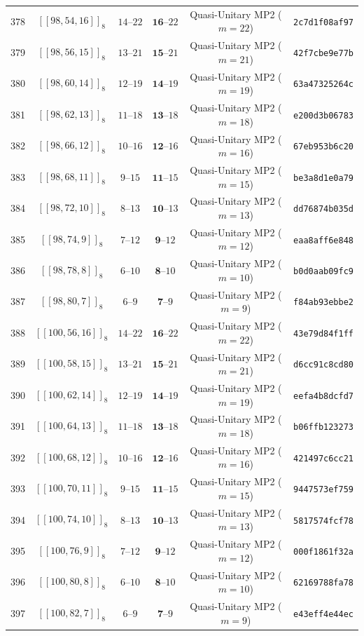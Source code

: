 \documentclass[11pt,a4paper]{article}
\theoremstyle{remark}
\begin{document}
{\begin{longtable}{@{}rccccl@{}}
378 & $[[98,54,16]]_{8}$ & $14\text{--}22$ & $\mathbf{16}\text{--}22$ & Quasi-Unitary MP2 ($m=22$) & \texttt{2c7d1f08af97} \\
379 & $[[98,56,15]]_{8}$ & $13\text{--}21$ & $\mathbf{15}\text{--}21$ & Quasi-Unitary MP2 ($m=21$) & \texttt{42f7cbe9e77b} \\
380 & $[[98,60,14]]_{8}$ & $12\text{--}19$ & $\mathbf{14}\text{--}19$ & Quasi-Unitary MP2 ($m=19$) & \texttt{63a47325264c} \\
381 & $[[98,62,13]]_{8}$ & $11\text{--}18$ & $\mathbf{13}\text{--}18$ & Quasi-Unitary MP2 ($m=18$) & \texttt{e200d3b06783} \\
382 & $[[98,66,12]]_{8}$ & $10\text{--}16$ & $\mathbf{12}\text{--}16$ & Quasi-Unitary MP2 ($m=16$) & \texttt{67eb953b6c20} \\
383 & $[[98,68,11]]_{8}$ & $9\text{--}15$ & $\mathbf{11}\text{--}15$ & Quasi-Unitary MP2 ($m=15$) & \texttt{be3a8d1e0a79} \\
384 & $[[98,72,10]]_{8}$ & $8\text{--}13$ & $\mathbf{10}\text{--}13$ & Quasi-Unitary MP2 ($m=13$) & \texttt{dd76874b035d} \\
385 & $[[98,74,9]]_{8}$ & $7\text{--}12$ & $\mathbf{9}\text{--}12$ & Quasi-Unitary MP2 ($m=12$) & \texttt{eaa8aff6e848} \\
386 & $[[98,78,8]]_{8}$ & $6\text{--}10$ & $\mathbf{8}\text{--}10$ & Quasi-Unitary MP2 ($m=10$) & \texttt{b0d0aab09fc9} \\
387 & $[[98,80,7]]_{8}$ & $6\text{--}9$ & $\mathbf{7}\text{--}9$ & Quasi-Unitary MP2 ($m=9$) & \texttt{f84ab93ebbe2} \\
388 & $[[100,56,16]]_{8}$ & $14\text{--}22$ & $\mathbf{16}\text{--}22$ & Quasi-Unitary MP2 ($m=22$) & \texttt{43e79d84f1ff} \\
389 & $[[100,58,15]]_{8}$ & $13\text{--}21$ & $\mathbf{15}\text{--}21$ & Quasi-Unitary MP2 ($m=21$) & \texttt{d6cc91c8cd80} \\
390 & $[[100,62,14]]_{8}$ & $12\text{--}19$ & $\mathbf{14}\text{--}19$ & Quasi-Unitary MP2 ($m=19$) & \texttt{eefa4b8dcfd7} \\
391 & $[[100,64,13]]_{8}$ & $11\text{--}18$ & $\mathbf{13}\text{--}18$ & Quasi-Unitary MP2 ($m=18$) & \texttt{b06ffb123273} \\
392 & $[[100,68,12]]_{8}$ & $10\text{--}16$ & $\mathbf{12}\text{--}16$ & Quasi-Unitary MP2 ($m=16$) & \texttt{421497c6cc21} \\
393 & $[[100,70,11]]_{8}$ & $9\text{--}15$ & $\mathbf{11}\text{--}15$ & Quasi-Unitary MP2 ($m=15$) & \texttt{9447573ef759} \\
394 & $[[100,74,10]]_{8}$ & $8\text{--}13$ & $\mathbf{10}\text{--}13$ & Quasi-Unitary MP2 ($m=13$) & \texttt{5817574fcf78} \\
395 & $[[100,76,9]]_{8}$ & $7\text{--}12$ & $\mathbf{9}\text{--}12$ & Quasi-Unitary MP2 ($m=12$) & \texttt{000f1861f32a} \\
396 & $[[100,80,8]]_{8}$ & $6\text{--}10$ & $\mathbf{8}\text{--}10$ & Quasi-Unitary MP2 ($m=10$) & \texttt{62169788fa78} \\
397 & $[[100,82,7]]_{8}$ & $6\text{--}9$ & $\mathbf{7}\text{--}9$ & Quasi-Unitary MP2 ($m=9$) & \texttt{e43eff4e44ec} \\
\end{longtable}
}
\end{document}
